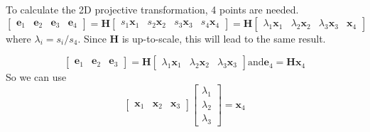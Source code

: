 \documentclass{../../assignment}
\begin{document}
\begin{problemlist}
\begin{enumerate}
To calculate the 2D projective transformation, 4 points are needed.
\[
\begin{bmatrix}
\mathbf{e}_1 & \mathbf{e}_2 & \mathbf{e}_3 & \mathbf{e}_4
\end{bmatrix} = 
\mathbf{H}
\begin{bmatrix}
s_1\mathbf{x}_1 & s_2\mathbf{x}_2 & s_3\mathbf{x}_3 & s_4\mathbf{x}_4
\end{bmatrix} = 
\mathbf{H}
\begin{bmatrix}
\lambda_1\mathbf{x}_1 & \lambda_2\mathbf{x}_2 & \lambda_3\mathbf{x}_3 & \mathbf{x}_4
\end{bmatrix}
\]
where $\lambda_i = s_i/s_4$. Since $\mathbf{H}$ is up-to-scale, this will lead to the same result.

\[
\begin{bmatrix}
\mathbf{e}_1 & \mathbf{e}_2 & \mathbf{e}_3
\end{bmatrix} = 
\mathbf{H}
\begin{bmatrix}
\lambda_1\mathbf{x}_1 & \lambda_2\mathbf{x}_2 & \lambda_3\mathbf{x}_3
\end{bmatrix} \mathrm{and}
\mathbf{e}_4 = \mathbf{H}\mathbf{x}_4
\]
So we can use
\[
\begin{bmatrix}
\mathbf{x}_1 & \mathbf{x}_2 & \mathbf{x}_3
\end{bmatrix}
\begin{bmatrix}
\lambda_1\\
\lambda_2\\
\lambda_3
\end{bmatrix}
 = 
\mathbf{x}_4
\]


\end{enumerate}
\end{problemlist}
\end{document}
